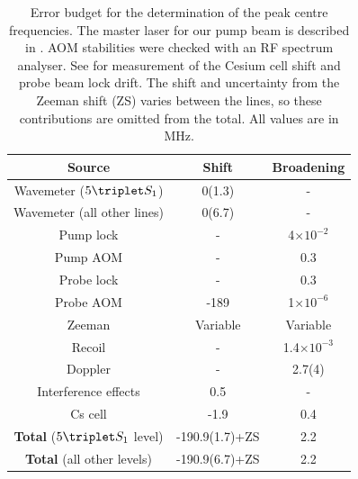 \begin{table}[b]
\caption{Error budget for the determination of the peak centre frequencies.  The master laser for our pump beam is described in \cite{Shin16}. AOM stabilities were checked with an RF spectrum analyser. See \cite{Thomas20} for measurement of the Cesium cell shift and probe beam lock drift. The shift and uncertainty from the Zeeman shift (ZS) varies between the lines, so these contributions are omitted from the total. All values are in MHz.}
  \label{tab:errors}
  \begin{tabular}{c c c}
      \hline\hline
          Source & Shift & Broadening  \\
      \hline
          Wavemeter ($5\triplet S_1$)& 0(1.3) & - \\
          Wavemeter (all other lines)& 0(6.7) & - \\
          Pump lock & - & 4$\times10^{-2}$ \\
          Pump AOM & - & 0.3 \\
          Probe lock & - & 0.3\\
          Probe AOM & -189 & 1$\times10^{-6}$\\
          Zeeman & Variable & Variable \\
          Recoil & - & 1.4$\times 10^{-3}$ \\ %
          Doppler & - & 2.7(4) \\
          Interference effects & 0.5 & - \\ 
          Cs cell & -1.9 & 0.4 \\
          \textbf{Total} ($5\triplet S_1$ level) & -190.9(1.7)+ZS& 2.2\\
          \textbf{Total} (all other levels) & -190.9(6.7)+ZS& 2.2\\
      \hline\hline
  \end{tabular}
  
\end{table}



